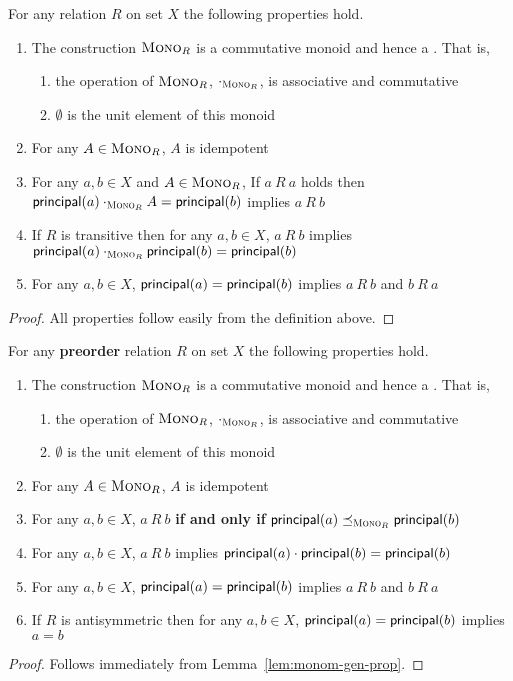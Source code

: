 \documentclass{scrartcl}
\begin{document}
\begin{lemma} \label{lem:monom-gen-prop}
  For any relation $R$ on set $X$ the following properties hold.
  \begin{enumerate}
  \item The construction $\textsc{Mono}_{R}$ is a commutative monoid and hence
    a \PCM{}. That is,
    \begin{enumerate}
    \item the operation of $\textsc{Mono}_{R}$, $\cdot_{\textsc{Mono}_{R}}$, is
      associative and commutative
    \item $\emptyset$ is the unit element of this monoid
    \end{enumerate}
  \item For any $A \in \textsc{Mono}_{R}$, $A$ is idempotent
  \item For any $a, b \in X$ and $A \in \textsc{Mono}_{R}$, If $a ~R~ a$ holds
    then $\mathsf{principal}(a) \cdot_{\textsc{Mono}_{R}} A = \mathsf{principal}(b)$ implies $a ~R~ b$
  \item If $R$ is transitive then for any $a, b \in X$, $a ~R~ b$
    implies $\mathsf{principal}(a)  \cdot_{\textsc{Mono}_{R}} \mathsf{principal}(b) = \mathsf{principal}(b)$
  \item For any $a, b \in X$, $\mathsf{principal}(a) = \mathsf{principal}(b)$ implies $a ~R~ b$ and $b ~R~a$
  \end{enumerate}
\end{lemma}
\begin{proof}
  All properties follow easily from the definition above.
\end{proof}

\begin{lemma}
  For any \textbf{preorder} relation $R$ on set $X$ the following
  properties hold.
  \begin{enumerate}
  \item The construction $\textsc{Mono}_{R}$ is a commutative monoid and hence
    a \PCM{}. That is,
      \begin{enumerate}
      \item the operation of $\textsc{Mono}_{R}$, $\cdot_{\textsc{Mono}_{R}}$, is
        associative and commutative
        \item $\emptyset$ is the unit element of this monoid
      \end{enumerate}
    \item For any $A \in \textsc{Mono}_{R}$, $A$ is idempotent
    \item For any $a, b \in X$, $a ~R~ b$ \textbf{if and only if} $\mathsf{principal}(a) \preceq_{\textsc{Mono}_{R}} \mathsf{principal}(b)$
    \item For any $a, b \in X$, $a ~R~ b$ implies $\mathsf{principal}(a) \cdot \mathsf{principal}(b) = \mathsf{principal}(b)$
    \item For any $a, b \in X$, $\mathsf{principal}(a) = \mathsf{principal}(b)$ implies $a ~R~ b$ and $b ~R~a$
    \item If $R$ is antisymmetric then for any $a, b \in X$,
      $\mathsf{principal}(a) = \mathsf{principal}(b)$ implies $a = b$
    \end{enumerate}
\end{lemma}
\begin{proof}
  Follows immediately from Lemma~\ref{lem:monom-gen-prop}.
\end{proof}
\end{document}
